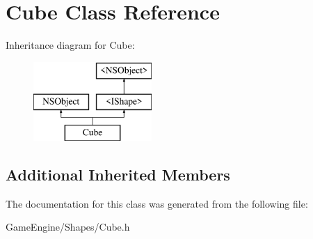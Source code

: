 \hypertarget{interface_cube}{}\section{Cube Class Reference}
\label{interface_cube}
Inheritance diagram for Cube\+:\begin{figure}[H]
\begin{center}
\leavevmode
\includegraphics[height=3.000000cm]{interface_cube}
\end{center}
\end{figure}
\subsection*{Additional Inherited Members}


The documentation for this class was generated from the following file\+:\begin{DoxyCompactItemize}
\item 
Game\+Engine/\+Shapes/Cube.\+h\end{DoxyCompactItemize}
